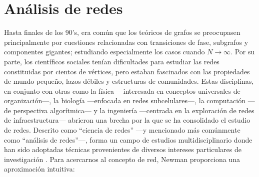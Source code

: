 \documentclass[letterpaper, 11pt]{book}
\theoremstyle{definition}
\theoremstyle{remark}
\begin{document}
\section{Análisis de redes}
\label{sec:AnalisisRedes}

Hasta finales de los 90's, era común que los teóricos de grafos se preocupasen principalmente por cuestiones relacionadas con transiciones de fase, subgrafos y componentes gigantes; estudiando especialmente los casos cuando $N \rightarrow \infty$. 
Por su parte, los científicos sociales tenían dificultades para estudiar las redes constituidas por cientos de vértices, pero estaban fascinados con las propiedades de mundo pequeño, lazos débiles y estructuras de comunidades. 
Estas disciplinas, en conjunto con otras como la física ---interesada en conceptos universales de organización---, la biología ---enfocada en redes subcelulares---, la computación ---de perspectiva algorítmica--- y la ingeniería ---centrada en la exploración de redes de infraestructura--- abrieron una brecha por la que se ha consolidado el estudio de redes. 
Descrito como ``ciencia de redes'' ---y mencionado más comúnmente como ``análisis de redes''---, forma un campo de estudios multidisciplinario donde han sido adoptadas técnicas provenientes de diversos intereses particulares de investigación \citep[9 y 16]{2015_Barabasi_NetworkScience}. Para acercarnos al concepto de red, Newman proporciona una aproximación intuitiva:
\end{document}
